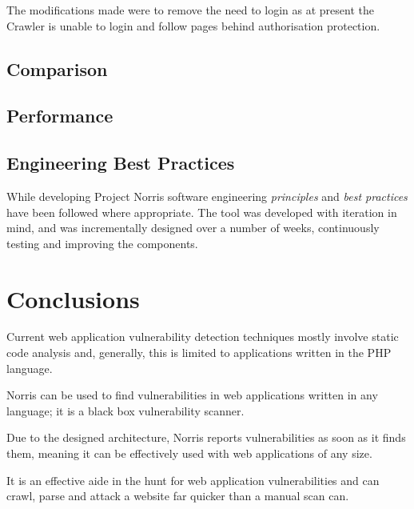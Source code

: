 \documentclass[12pt,a4paper]{article}
\begin{document}
The modifications made were to remove the need to login as at present the Crawler is unable to login and follow pages behind authorisation protection.

\subsection{Comparison}

\subsection{Performance}

\subsection{Engineering Best Practices}
While developing Project Norris software engineering \emph{principles} and \emph{best practices} have been followed where appropriate.  The tool was developed with iteration in mind, and was incrementally designed over a number of weeks, continuously testing and improving the components.

\section{Conclusions}

Current web application vulnerability detection techniques mostly involve static code analysis and, generally, this is limited to applications written in the PHP language.

Norris can be used to find vulnerabilities in web applications written in any language; it is a black box vulnerability scanner. 

Due to the designed architecture, Norris reports vulnerabilities as soon as it finds them, meaning it can be effectively used with web applications of any size.

It is an effective aide in the hunt for web application vulnerabilities and can crawl, parse and attack a website far quicker than a manual scan can.


\end{document}
